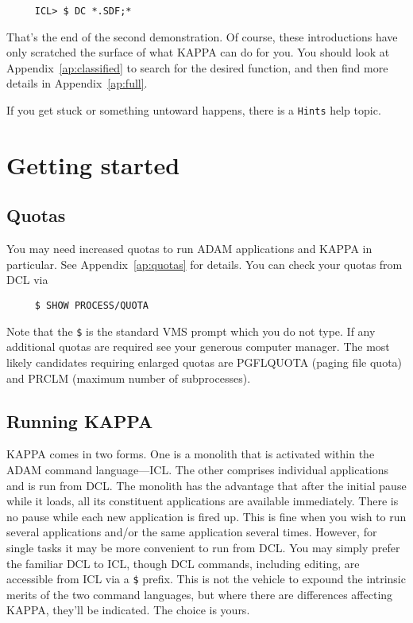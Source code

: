 \small
\begin{verbatim}
     ICL> $ DC *.SDF;*
\end{verbatim}
\normalsize

That's the end of the second demonstration.  Of course, these
introductions have only scratched the surface of what {\small KAPPA} can
do for you.  You should look at Appendix~\ref{ap:classified} to search
for the desired function, and then find more details in
Appendix~\ref{ap:full}.

If you get stuck or something untoward happens, there is a {\tt Hints}
help topic.

\newpage
\section{Getting started}

\subsection{Quotas}
You may need increased quotas to run {\small ADAM} applications and
{\small KAPPA} in particular.  See Appendix~\ref{ap:quotas} for details.
You can check your quotas from {\small DCL} via

\small
\begin{verbatim}
     $ SHOW PROCESS/QUOTA
\end{verbatim}
\normalsize
Note that the {\tt \$} is the standard VMS prompt which you do not type.
If any additional quotas are required see your generous computer
manager. The most likely candidates requiring enlarged quotas are PGFLQUOTA
(paging file quota) and PRCLM (maximum number of subprocesses).

\subsection{Running KAPPA}
{\small KAPPA} comes in two forms.  One is a monolith that is activated
within the {\small ADAM} command language---{\small ICL}.  The other
comprises individual applications and is run from {\small DCL}.  The
monolith has the advantage that after the initial pause while it loads,
all its constituent applications are available immediately.  There is no
pause while each new application is fired up.  This is fine when you
wish to run several applications and/or the same application several
times. However, for single tasks it may be more convenient to run from
{\small DCL}.  You may simply prefer the familiar {\small DCL} to
{\small ICL}, though {\small DCL} commands, including editing, are
accessible from {\small ICL} via a {\tt \$} prefix. This is not the
vehicle to expound the intrinsic merits of the two
command languages, but where there are differences affecting {\small
KAPPA}, they'll be indicated. The choice is yours.

